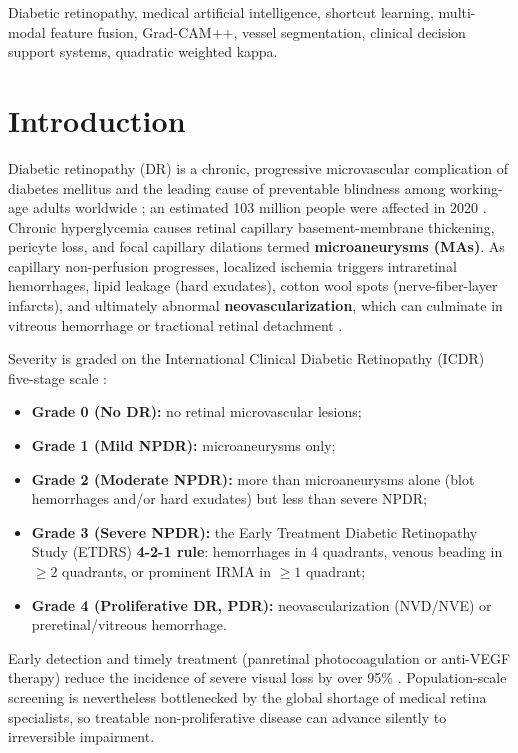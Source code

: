 \documentclass[conference]{IEEEtran}
\begin{document}
\begin{IEEEkeywords}
Diabetic retinopathy, medical artificial intelligence, shortcut learning, multi-modal feature fusion, Grad-CAM++, vessel segmentation, clinical decision support systems, quadratic weighted kappa.
\end{IEEEkeywords}

\section{Introduction}

Diabetic retinopathy (DR) is a chronic, progressive microvascular complication of diabetes mellitus and the leading cause of preventable blindness among working-age adults worldwide \cite{cheung2010,yau2012}; an estimated 103 million people were affected in 2020 \cite{teo2021}. Chronic hyperglycemia causes retinal capillary basement-membrane thickening, pericyte loss, and focal capillary dilations termed \textbf{microaneurysms (MAs)}. As capillary non-perfusion progresses, localized ischemia triggers intraretinal hemorrhages, lipid leakage (hard exudates), cotton wool spots (nerve-fiber-layer infarcts), and ultimately abnormal \textbf{neovascularization}, which can culminate in vitreous hemorrhage or tractional retinal detachment \cite{fong2004}.

Severity is graded on the International Clinical Diabetic Retinopathy (ICDR) five-stage scale \cite{wilkinson2003}:
\begin{itemize}
\item \textbf{Grade 0 (No DR):} no retinal microvascular lesions;
\item \textbf{Grade 1 (Mild NPDR):} microaneurysms only;
\item \textbf{Grade 2 (Moderate NPDR):} more than microaneurysms alone (blot hemorrhages and/or hard exudates) but less than severe NPDR;
\item \textbf{Grade 3 (Severe NPDR):} the Early Treatment Diabetic Retinopathy Study (ETDRS) \textbf{4-2-1 rule}: hemorrhages in 4 quadrants, venous beading in $\ge 2$ quadrants, or prominent IRMA in $\ge 1$ quadrant;
\item \textbf{Grade 4 (Proliferative DR, PDR):} neovascularization (NVD/NVE) or preretinal/vitreous hemorrhage.
\end{itemize}
Early detection and timely treatment (panretinal photocoagulation or anti-VEGF therapy) reduce the incidence of severe visual loss by over 95\% \cite{etdrs10}. Population-scale screening is nevertheless bottlenecked by the global shortage of medical retina specialists, so treatable non-proliferative disease can advance silently to irreversible impairment.
\end{document}
